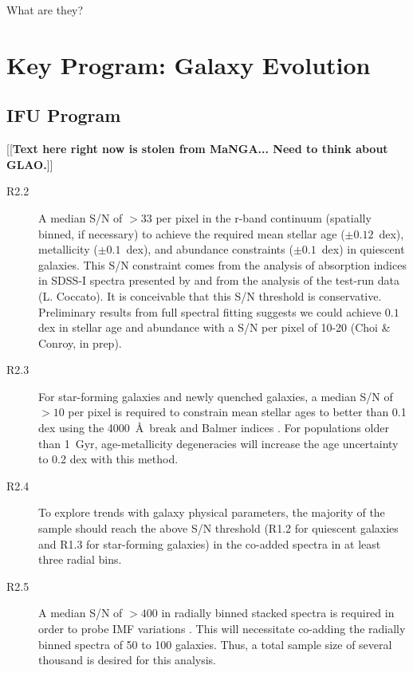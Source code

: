 \documentclass[preprint,11pt]{aastex}
\newcommand{\edit}[2][todo]{{\color{#1}[[{\bf #2}]]}}
\begin{document}
What are they?


\section{Key Program: Galaxy Evolution}\label{prog:galaxies}

\subsection{IFU Program}\label{prog:galaxies-IFU}

\edit{Text here right now is stolen from MaNGA...  Need to think about GLAO.}

\begin{description}
 \item[R2.2] A median S/N of $>33$ per pixel in the r-band continuum
   (spatially binned, if necessary) to achieve the required mean
   stellar age ($\pm0.12$~dex), metallicity ($\pm0.1$~dex), and
   abundance constraints ($\pm0.1$~dex) in quiescent galaxies. This
   S/N constraint comes from the analysis of absorption indices in
   SDSS-I spectra presented by \cite{johansson12} and from the
   analysis of the test-run data (L. Coccato).  It is conceivable that
   this S/N threshold is conservative. Preliminary results from full
   spectral fitting suggests we could achieve $0.1$ dex in stellar age
   and abundance with a S/N per pixel of 10-20 (Choi \& Conroy, in
   prep).
   

 \item[R2.3] For star-forming galaxies and newly quenched galaxies, a
   median S/N of $>10$ per pixel is required to constrain mean stellar
   ages to better than 0.1 dex using the 4000~\AA\ break and Balmer
   indices \citep{kauffmann03a}.  For populations older than 1~Gyr,
   age-metallicity degeneracies will increase the age uncertainty to 0.2
   dex with this method.


 \item[R2.4] To explore trends with galaxy physical parameters, the
   majority of the sample should reach the above S/N threshold (R1.2
   for quiescent galaxies and R1.3 for star-forming galaxies) in the
   co-added spectra in at least three radial bins.

\item[R2.5] A median S/N of $>400$ in radially binned stacked spectra
  is required in order to probe IMF variations \citep{ferreras2013}.
  This will necessitate co-adding the radially binned spectra of 50 to
  100 galaxies.  Thus, a total sample size of several thousand is desired
  for this analysis.

\end{description}
\end{document}
